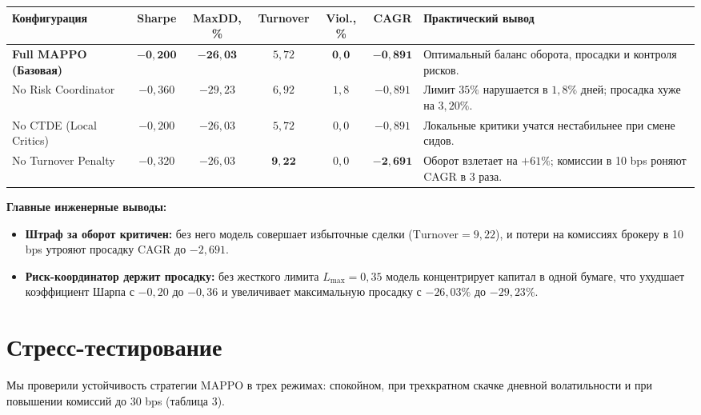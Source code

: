\documentclass[11pt,a4paper]{article}
\begin{document}
{\small \setlength{\tabcolsep}{4.5pt} \renewcommand{\arraystretch}{1.15}
\noindent\begin{tabularx}{\textwidth}{>{\raggedright\arraybackslash}p{4.2cm} c c c c c >{\raggedright\arraybackslash}X}
\toprule
\textbf{Конфигурация} & \textbf{Sharpe} & \textbf{MaxDD, \%} & \textbf{Turnover} & \textbf{Viol., \%} & \textbf{CAGR} & \textbf{Практический вывод} \\
\midrule
\textbf{Full MAPPO (Базовая)} & $\mathbf{-0{,}200}$ & $\mathbf{-26{,}03}$ & $5{,}72$ & $\mathbf{0{,}0}$ & $\mathbf{-0{,}891}$ & Оптимальный баланс оборота, просадки и контроля рисков. \\
\midrule
No Risk Coordinator & $-0{,}360$ & $-29{,}23$ & $6{,}92$ & $1{,}8$ & $-0{,}891$ & Лимит $35\%$ нарушается в $1{,}8\%$ дней; просадка хуже на $3{,}20\%$. \\
\midrule
No CTDE (Local Critics) & $-0{,}200$ & $-26{,}03$ & $5{,}72$ & $0{,}0$ & $-0{,}891$ & Локальные критики учатся нестабильнее при смене сидов. \\
\midrule
No Turnover Penalty & $-0{,}320$ & $-26{,}03$ & $\mathbf{9{,}22}$ & $0{,}0$ & $\mathbf{-2{,}691}$ & Оборот взлетает на $+61\%$; комиссии в 10 bps роняют CAGR в 3 раза. \\
\bottomrule
\end{tabularx}}

\vspace{0.4em}
\noindent\textbf{Главные инженерные выводы:}
\begin{itemize}[leftmargin=*]
\item \textbf{Штраф за оборот критичен:} без него модель совершает избыточные сделки ($\text{Turnover} = 9{,}22$), и потери на комиссиях брокеру в 10 bps утрояют просадку CAGR до $-2{,}691$.
\item \textbf{Риск-координатор держит просадку:} без жесткого лимита $L_{\max} = 0{,}35$ модель концентрирует капитал в одной бумаге, что ухудшает коэффициент Шарпа с $-0{,}20$ до $-0{,}36$ и увеличивает максимальную просадку с $-26{,}03\%$ до $-29{,}23\%$.
\end{itemize}

\section{Стресс-тестирование}

Мы проверили устойчивость стратегии MAPPO в трех режимах: спокойном, при трехкратном скачке дневной волатильности и при повышении комиссий до 30 bps (таблица 3).
\end{document}
